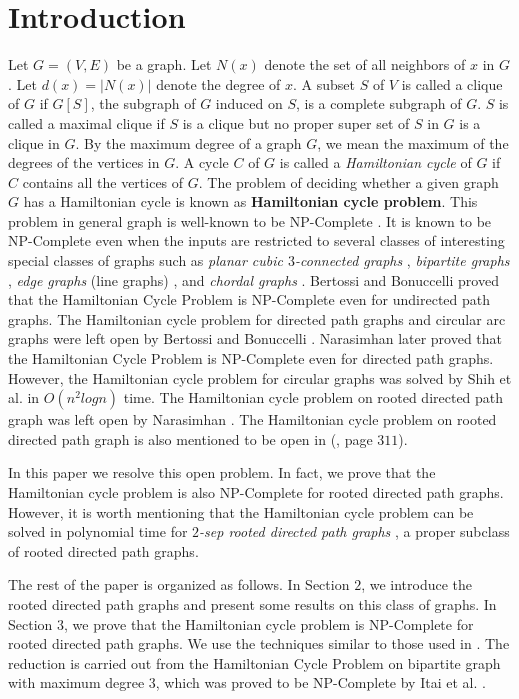 \documentclass[a4paper,12pt]{article}
\theoremstyle{plain}
\theoremstyle{definition}
\theoremstyle{remark}
\begin{document}
\section{Introduction}
Let $G=(V,E)$ be a graph. Let $N(x)$ denote the set of all neighbors
of $x$ in $G$. Let $d(x)=|N(x)|$ denote the degree of $x$. A subset
$ S$ of $V$ is called a clique of $G$ if $G[S]$, the subgraph of $G$
induced on $S$, is a complete subgraph of $G$. $S$ is called a
maximal clique if $S$ is a clique but no proper super set of $S$ in
$G$ is a clique in $G$. By the maximum degree of a graph $G$, we
mean the maximum of the degrees of the vertices in $G$. A cycle $C$
of $G$ is called a {\it Hamiltonian cycle} of $G$ if $C$ contains
all the vertices of $G$. The problem of deciding whether a given
graph $G$ has a Hamiltonian cycle is known as {\bf Hamiltonian cycle
problem}. This problem in general graph is well-known to be
NP-Complete \cite{garey}. It is known to be NP-Complete even when
the inputs are restricted to several classes of interesting special
classes of graphs such as {\it planar cubic $3$-connected graphs}
\cite{dawes}, {\it bipartite graphs} \cite{bipartite}, {\it edge
graphs} (line graphs) \cite{booth}, and {\it chordal graphs}
\cite{stewart}. Bertossi and Bonuccelli \cite{bert} proved that the
Hamiltonian Cycle Problem is NP-Complete even for undirected path
graphs. The Hamiltonian cycle problem for directed path graphs and
circular arc graphs were left open by Bertossi and Bonuccelli
\cite{bert}. Narasimhan \cite{giri} later proved that the
Hamiltonian Cycle Problem is NP-Complete even for directed path
graphs. However, the Hamiltonian cycle problem for circular graphs
was solved   by Shih et al.\cite{hsu} in $O(n^2logn)$ time.
The Hamiltonian cycle problem on rooted directed path graph was left
open  by Narasimhan \cite{giri}. The Hamiltonian cycle problem on
rooted directed path graph is also mentioned to be open in
(\cite{spinrad}, page $311$).

In this paper we resolve this open problem. In fact, we prove that
the Hamiltonian cycle problem is also NP-Complete for rooted
directed path graphs. However, it is worth mentioning that the
Hamiltonian cycle problem can be solved in polynomial time for {\it
$2$-sep rooted directed path graphs} \cite{panda}, a proper subclass
of rooted directed path graphs.

 The rest of the paper is organized as follows. In Section $2$, we
introduce the rooted directed path graphs and present some results
on this class of graphs. In Section $3$, we prove that the
Hamiltonian cycle problem is NP-Complete for  rooted directed path
graphs. We use the techniques similar to those used in
\cite{bert,giri}. The reduction is carried out from the Hamiltonian
Cycle Problem on bipartite graph with maximum  degree $3$, which was
proved to be NP-Complete by Itai et al. \cite{itai}.
\end{document}
